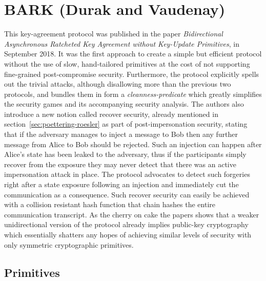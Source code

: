 \documentclass[11pt,a4paper,twoside,openright,bibliography=totoc]{scrbook}
\begin{document}
\clearpage

\section[BARK (Durak and Vaudenay)]
{BARK (Durak and Vaudenay)~\cite{durak2018bidirectional}}
\label{sec:durak-vaudenay}

This key-agreement protocol was published in the paper
\textit{Bidirectional Asynchronous Ratcheted Key Agreement without
Key-Update Primitives}, in September 2018. It was the first approach to
create a simple but efficient protocol without the use of slow,
hand-tailored primitives at the cost of not supporting fine-grained
post-compromise security. Furthermore, the protocol explicitly spells
out the trivial attacks, although disallowing more than the previous
two protocols, and bundles them in form a \textit{cleanness-predicate}
which greatly simplifies the security games and its accompanying
security analysis. The authors also introduce a new notion called
recover security, already mentioned in section~\ref{sec:poettering-roesler}
as part of post-impersonation security,
stating that if the adversary manages to inject a message to Bob
then any further message from Alice to Bob should be rejected.
Such an injection can happen after Alice's state has been leaked to the adversary,
thus if the participants simply recover from the exposure they may
never detect that there was an active impersonation attack in place.
The protocol advocates to detect such forgeries right after a
state exposure following an injection and immediately cut the communication as a
consequence. Such recover security can easily be achieved with a
collision resistant hash function that chain hashes the entire
communication transcript. As the cherry on cake the papers shows that
a weaker unidirectional version of the protocol already implies
public-key cryptography which essentially shatters any hopes of
achieving similar levels of security with only symmetric
cryptographic primitives.

\subsection{Primitives}
\label{sec:primitives-2}
\end{document}
